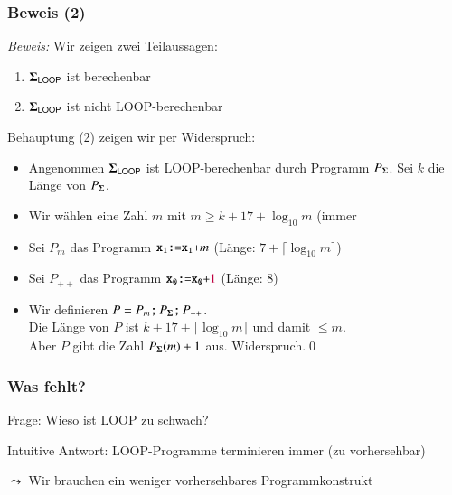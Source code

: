 \documentclass[onlymath]{beamer}
\begin{document}
\begin{frame}[t]\frametitle{Beweis (2)}


\emph{Beweis:} Wir zeigen zwei Teilaussagen:

\begin{enumerate}[(1)]
\item $\boldsymbol{\Sigma}_{\textsf{LOOP}}$ ist berechenbar
\item $\boldsymbol{\Sigma}_{\textsf{LOOP}}$ ist nicht LOOP-berechenbar
\end{enumerate}\pause

Behauptung (2) zeigen wir per Widerspruch:\pause
\begin{itemize}
\item Angenommen $\boldsymbol{\Sigma}_{\textsf{LOOP}}$ ist LOOP-berechenbar durch Programm $P_{\boldsymbol{\Sigma}}$. Sei $k$ die Länge von $P_{\boldsymbol{\Sigma}}$.\pause
\item Wir wählen eine Zahl $m$ mit $m\geq k+17+\log_{10} m$ (immer \pause
\item Sei $P_m$ das Programm $\texttt{x}_{\texttt{1}}\texttt{:=}\texttt{x}_{\texttt{1}}\texttt{+}m$ (Länge: $7+\lceil\log_{10}m\rceil$)\pause
\item Sei $P_{++}$ das Programm $\texttt{x}_{\texttt{0}}\texttt{:=}\texttt{x}_{\texttt{0}}\texttt{+}\textcolor{purple}{1}$ (Länge: $8$)\pause
\item Wir definieren $P = P_m\texttt{;}\, P_{\boldsymbol{\Sigma}}\texttt{;}\, P_{++}$.\\\pause
Die Länge von $P$ ist $k+17+\lceil\log_{10}m\rceil$ und damit $\leq m$.\\\pause
Aber $P$ gibt die Zahl $P_{\boldsymbol{\Sigma}}(m)+1$ aus. 
Widerspruch.\qed
\end{itemize}

\end{frame}


\begin{frame}\frametitle{Was fehlt?}

\alert{Frage:} Wieso ist LOOP zu schwach?\medskip\pause

\alert{Intuitive Antwort:} LOOP-Programme terminieren immer (zu vorhersehbar)
\bigskip

$\leadsto$ Wir brauchen ein weniger vorhersehbares Programmkonstrukt

\end{frame}
\end{document}
